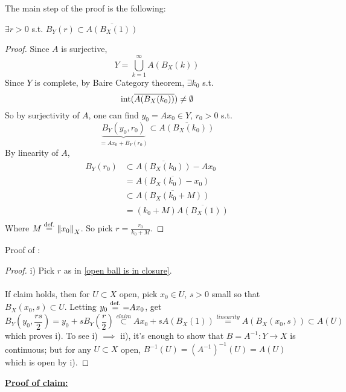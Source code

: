 \documentclass{article}
\begin{document}
The main step of the proof is the following:
\begin{lemma}[$A$ as in i)]\nl
\label{open ball is in closure}
$\exists r>0$ s.t. $B_Y(r)\subset \overline{A(B_X(1))}$
\end{lemma}
\begin{proof}
Since $A$ is surjective, 
$$
Y=\bigcup_{k=1}^\infty A(B_X(k))
$$
Since $Y$ is complete, by  Baire Category theorem, $\exists k_0$ s.t. 
$$ \textrm{int} (\overline{A(B_X(k_0))})\neq\emptyset$$
So by surjectivity of $A$, one can find $y_0=Ax_0\in Y$, $r_0>0$ s.t. 
$$ \underbrace{B_Y(y_0,r_0)}_{=Ax_0+B_Y(r_0)}\subset \overline{A(B_X(k_0))}$$
By linearity of $A$,
\begin{equation}\nonumber
    \begin{split}
        B_Y(r_0)&\subset\overline{A(B_X(k_0))}-Ax_0 \\ &=\overline{A(B_X(k_0)-x_0)}\\
        &\subset \overline{A(B_X(k_0+M))}   \\
        &=(k_0+M)\overline{A(B_X(1))}\\
    \end{split}
\end{equation}
Where $M\stackrel{\text{def.}}{=} \left\|{x_0}\right\|_X$. So pick $r=\frac{r_0}{k_0+M}$.
\end{proof}


Proof of :  

\begin{proof}
i) Pick $r$ as in \cref{open ball is in closure}.\\
\\
If claim holds, then for $U\subset X$ open, pick $x_0\in U$, $s>0$ small so that $B_X(x_0,s)\subset U$. Letting $y_0\stackrel{\text{def.}}{=}{=}Ax_0$, get 
$$
B_Y(y_0,\frac{rs}{2})=y_0+sB_Y(\frac{r}{2})\stackrel{claim}{\subset}Ax_0+sA(B_X(1))\stackrel{linearity}{=}A(B_X(x_0,s))\subset A(U)
$$
which proves i). To see i) $\implies$ ii), it's enough to show that $B=A^{-1}:Y\to X$ is continuous; but for any $U\subset X$ open, $B^{-1}(U)=(A^{-1})^{-1}(U)=A(U)$
which is open by i).
\end{proof}

\underline{\textbf{Proof of claim:}}
\end{document}
